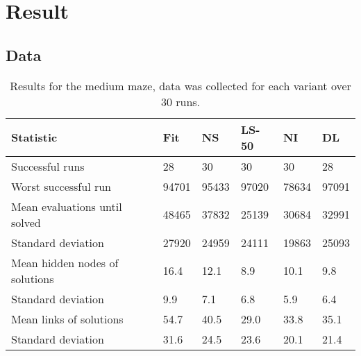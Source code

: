 \section{Result}
\label{sec:Result}

\subsection{Data}
\begin{table}[H]
    \centering
    \begin{tabular}{llllll}
    \toprule
    Statistic & \multicolumn{1}{l}{Fit} & \multicolumn{1}{l}{NS} & \multicolumn{1}{l}{LS-50} & \multicolumn{1}{l}{NI} & \multicolumn{1}{l}{DL} \\
    \midrule
    Successful runs & 28 & 30 & 30 & 30 & 28 \\
    Worst successful run & 94701 & 95433 & 97020 & 78634 & 97091 \\
    \rowcolor[gray]{.9} Mean evaluations until solved & 48465 & 37832 & 25139 & 30684 & 32991 \\
    Standard deviation & 27920  & 24959 & 24111 & 19863 & 25093 \\
    \rowcolor[gray]{.9} Mean hidden nodes of solutions & 16.4 & 12.1  & 8.9  & 10.1 & 9.8 \\
    Standard deviation & 9.9 & 7.1 & 6.8 & 5.9 & 6.4 \\
    \rowcolor[gray]{.9} Mean links of solutions & 54.7  & 40.5 & 29.0 & 33.8 & 35.1 \\
    Standard deviation & 31.6  & 24.5 & 23.6 & 20.1 & 21.4\\
    \bottomrule
    \end{tabular}
    \caption{Results for the medium maze, data was collected for each variant over 30 runs.}
    \label{medium}
\end{table}



